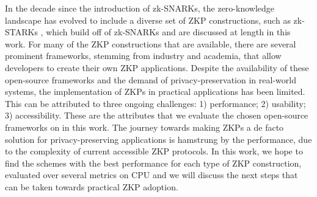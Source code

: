 In the decade since the introduction of zk-SNARKs, the zero-knowledge landscape has evolved to include a diverse set of ZKP constructions, such as zk-STARKs \cite{ben2018scalable}, which build off of zk-SNARKs and are discussed at length in this work. For many of the ZKP constructions that are available, there are several prominent frameworks, stemming from industry and academia, that allow developers to create their own ZKP applications. Despite the availability of these open-source frameworks and the demand of privacy-preservation in real-world systems, the implementation of ZKPs in practical applications has been limited. This can be attributed to three ongoing challenges: 1) performance; 2) usability; 3) accessibility. These are the attributes that we evaluate the chosen open-source frameworks on in this work.
The journey towards making ZKPs a de facto solution for privacy-preserving applications is hamstrung by the performance, due to the complexity of current accessible ZKP protocols. 
In this work, we hope to find the schemes with the best performance for each type of ZKP construction, evaluated over several metrics on CPU and we will discuss the next steps that can be taken towards practical ZKP adoption. 

